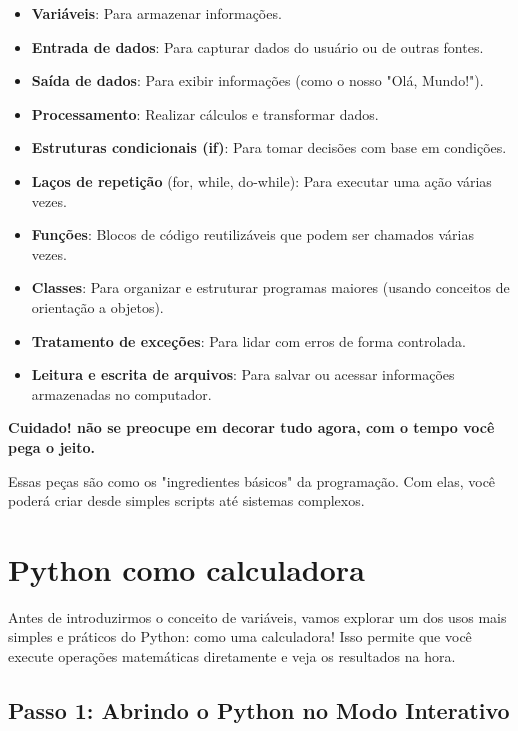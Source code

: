 \documentclass[12pt]{book}
\begin{document}
	\begin{tcolorbox}[colback=gray!10, colframe=black, title={\large\bfseries Componentes de um programa}]
		\begin{itemize}
			\item \textbf{Variáveis}: Para armazenar informações.
			\item \textbf{Entrada de dados}: Para capturar dados do usuário ou de outras fontes.
			\item \textbf{Saída de dados}: Para exibir informações (como o nosso "Olá, Mundo!").
			\item \textbf{Processamento}: Realizar cálculos e transformar dados.
			\item \textbf{Estruturas condicionais (if)}: Para tomar decisões com base em condições.
			\item \textbf{Laços de repetição }(for, while, do-while): Para executar uma ação várias vezes.
			\item \textbf{Funções}: Blocos de código reutilizáveis que podem ser chamados várias vezes.
			\item \textbf{Classes}: Para organizar e estruturar programas maiores (usando conceitos de orientação a objetos).
			\item \textbf{Tratamento de exceções}: Para lidar com erros de forma controlada.
			\item \textbf{Leitura e escrita de arquivos}: Para salvar ou acessar informações armazenadas no computador.
		\end{itemize}
		\vspace{8mm}
		\textbf{Cuidado! não se preocupe em decorar tudo agora, com o tempo você pega o jeito.}
	\end{tcolorbox}
	
	Essas peças são como os "ingredientes básicos" da programação. Com elas, você poderá criar desde simples scripts até sistemas complexos.
	
	\section{Python como calculadora}
	
	Antes de introduzirmos o conceito de variáveis, vamos explorar um dos usos mais simples e práticos do Python: como uma calculadora! Isso permite que você execute operações matemáticas diretamente e veja os resultados na hora.
	\subsection{Passo 1: Abrindo o Python no Modo Interativo}
	
\end{document}

